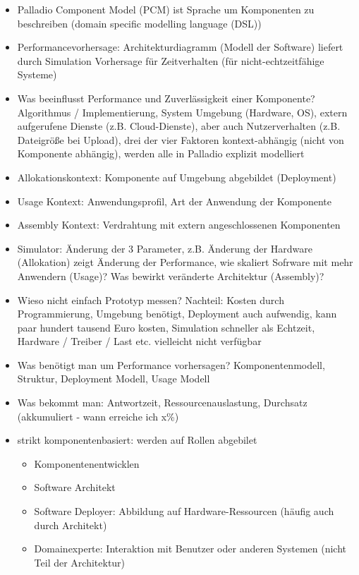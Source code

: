 \documentclass[paper=a4, fontsize=11pt]{scrartcl} %
\numberwithin{equation}{section} %
\numberwithin{figure}{section} %
\numberwithin{table}{section} %
\begin{document}
\begin{itemize}
\begin{itemize}
    \begin{itemize}
      \item Palladio Component Model (PCM) ist Sprache um Komponenten zu beschreiben (domain specific modelling language (DSL))
      \item Performancevorhersage: Architekturdiagramm (Modell der Software) liefert durch Simulation Vorhersage für Zeitverhalten (für nicht-echtzeitfähige Systeme)
      \item Was beeinflusst Performance und Zuverlässigkeit einer Komponente? Algorithmus / Implementierung, System Umgebung (Hardware, OS), extern aufgerufene Dienste (z.B. Cloud-Dienste), aber auch Nutzerverhalten (z.B. Dateigröße bei Upload), drei der vier Faktoren kontext-abhängig (nicht von Komponente abhängig), werden alle in Palladio explizit modelliert
      \item Allokationskontext: Komponente auf Umgebung abgebildet (Deployment)
      \item Usage Kontext: Anwendungsprofil, Art der Anwendung der Komponente
      \item Assembly Kontext: Verdrahtung mit extern angeschlossenen Komponenten
      \item Simulator: Änderung der 3 Parameter, z.B. Änderung der Hardware (Allokation) zeigt Änderung der Performance, wie skaliert Sofrware mit mehr Anwendern (Usage)? Was bewirkt veränderte Architektur (Assembly)?
      \item Wieso nicht einfach Prototyp messen? Nachteil: Kosten durch Programmierung, Umgebung benötigt, Deployment auch aufwendig, kann paar hundert tausend Euro kosten, Simulation schneller als Echtzeit, Hardware / Treiber / Last etc. vielleicht nicht verfügbar
      \item Was benötigt man um Performance vorhersagen? Komponentenmodell, Struktur, Deployment Modell, Usage Modell
      \item Was bekommt man: Antwortzeit, Ressourcenauslastung, Durchsatz (akkumuliert - wann erreiche ich x\%)
      \item strikt komponentenbasiert: werden auf Rollen abgebilet
      \begin{itemize}
        \item Komponentenentwicklen
        \item Software Architekt
        \item Software Deployer: Abbildung auf Hardware-Ressourcen (häufig auch durch Architekt)
        \item Domainexperte: Interaktion mit Benutzer oder anderen Systemen (nicht Teil der Architektur)

\end{itemize}
\end{itemize}
\end{itemize}
\end{itemize}
\end{document}
